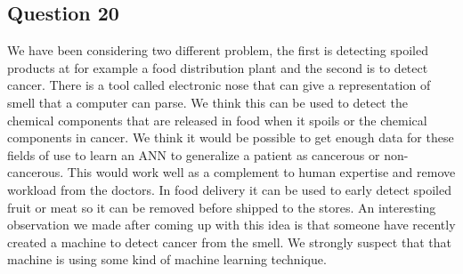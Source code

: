 \documentclass[a4paper]{article}
\begin{document}
\subsection*{Question 20}
We have been considering two different problem, the first is detecting spoiled products at for example a food distribution plant and the second is to detect cancer. There is a tool called electronic nose that can give a representation of smell that a computer can parse. We think this can be used to detect the chemical components that are released in food when it spoils or the chemical components in cancer. We think it would be possible to get enough data for these fields of use to learn an ANN to generalize a patient as cancerous or non-cancerous. This would work well as a complement to human expertise and remove workload from the doctors. 
In food delivery it can be used to early detect spoiled fruit or meat so it can be removed before shipped to the stores.
An interesting observation we made after coming up with this idea is that someone have recently created a machine to detect cancer from the smell. We strongly suspect that that machine is using some kind of machine learning technique.
\end{document}
